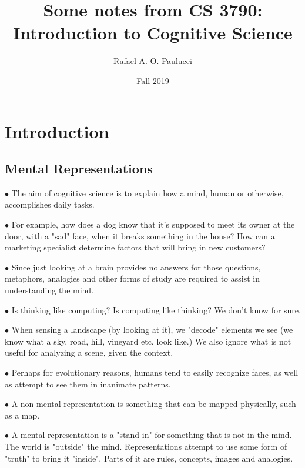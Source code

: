 \documentclass[english,openany]{book}
\begin{document}
    \title{Some notes from CS 3790: Introduction to Cognitive Science}
    \author{Rafael A. O. Paulucci}
    \date{Fall 2019}

    \maketitle

    \tableofcontents


    \chapter{Introduction}


\section{Mental Representations}

$\bullet$ The aim of cognitive science is to explain how a mind, human or otherwise, accomplishes daily tasks.

$\bullet$ For example, how does a dog know that it's supposed to meet its owner at the door, with a "sad" face, when it breaks something in the house? How can a marketing specialist determine factors that will bring in new customers?

$\bullet$ Since just looking at a brain provides no answers for those questions, metaphors, analogies and other forms of study are required to assist in understanding the mind.

$\bullet$ Is thinking like computing? Is computing like thinking? We don't know for sure.

$\bullet$ When sensing a landscape (by looking at it), we "decode" elements we see (we know what a sky, road, hill, vineyard etc. look like.) We also ignore what is not useful for analyzing a scene, given the context.

$\bullet$ Perhaps for evolutionary reasons, humans tend to easily recognize faces, as well as attempt to see them in inanimate patterns.

$\bullet$ A non-mental representation is something that can be mapped physically, such as a map.

$\bullet$ A mental representation is a "stand-in" for something that is not in the mind. The world is "outside" the mind. Representations attempt to use some form of "truth" to bring it "inside". Parts of it are rules, concepts, images and analogies.
\end{document}
